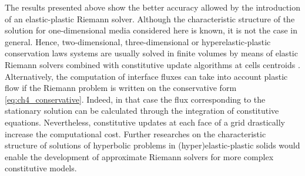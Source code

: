 The results presented above show the better accuracy allowed by the introduction of an elastic-plastic Riemann solver.
Although the characteristic structure of the solution for one-dimensional media considered here is known, it is not the case in general.
Hence, two-dimensional, three-dimensional or hyperelastic-plastic conservation laws systems are usually solved in finite volumes by means of elastic Riemann solvers combined with constitutive update algorithms at cells centroids \cite{Haider_FVM,Salbasivan_elastoplastoc,Maire_elastoplast}.
Alternatively, the computation of interface fluxes can take into account plastic flow if the Riemann problem is written on the conservative form \eqref{eq:ch4_conservative}.
Indeed, in that case the flux corresponding to the stationary solution can be calculated through the integration of constitutive equations.
Nevertheless, constitutive updates at each face of a grid drastically increase the computational cost.
Further researches on the characteristic structure of solutions of hyperbolic problems in (hyper)elastic-plastic solids would enable the development of approximate Riemann solvers for more complex constitutive models.


